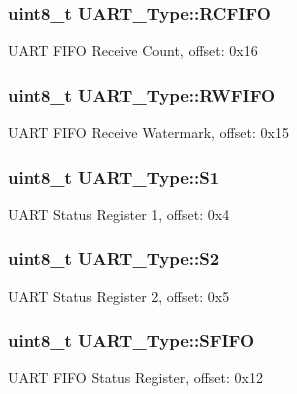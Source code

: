 \subsubsection[{\texorpdfstring{R\+C\+F\+I\+FO}{RCFIFO}}]{ uint8\+\_\+t U\+A\+R\+T\+\_\+\+Type\+::\+R\+C\+F\+I\+FO}\hypertarget{structUART__Type_ac56a9dbfe3a97f625a4cb0a787303c2d}{}\label{structUART__Type_ac56a9dbfe3a97f625a4cb0a787303c2d}
U\+A\+RT F\+I\+FO Receive Count, offset\+: 0x16 
\subsubsection[{\texorpdfstring{R\+W\+F\+I\+FO}{RWFIFO}}]{ uint8\+\_\+t U\+A\+R\+T\+\_\+\+Type\+::\+R\+W\+F\+I\+FO}\hypertarget{structUART__Type_a2d214e3cdbe0ac2d09bcf20ab132439e}{}\label{structUART__Type_a2d214e3cdbe0ac2d09bcf20ab132439e}
U\+A\+RT F\+I\+FO Receive Watermark, offset\+: 0x15 
\subsubsection[{\texorpdfstring{S1}{S1}}]{ uint8\+\_\+t U\+A\+R\+T\+\_\+\+Type\+::\+S1}\hypertarget{structUART__Type_ab085fb9bbfccce5ace6b752d9784ee26}{}\label{structUART__Type_ab085fb9bbfccce5ace6b752d9784ee26}
U\+A\+RT Status Register 1, offset\+: 0x4 
\subsubsection[{\texorpdfstring{S2}{S2}}]{ uint8\+\_\+t U\+A\+R\+T\+\_\+\+Type\+::\+S2}\hypertarget{structUART__Type_ad9178df20b457eace88576a7cb26d75d}{}\label{structUART__Type_ad9178df20b457eace88576a7cb26d75d}
U\+A\+RT Status Register 2, offset\+: 0x5 
\subsubsection[{\texorpdfstring{S\+F\+I\+FO}{SFIFO}}]{ uint8\+\_\+t U\+A\+R\+T\+\_\+\+Type\+::\+S\+F\+I\+FO}\hypertarget{structUART__Type_a288d7a13955e4a2637a2021d9ba2e0a8}{}\label{structUART__Type_a288d7a13955e4a2637a2021d9ba2e0a8}
U\+A\+RT F\+I\+FO Status Register, offset\+: 0x12 
